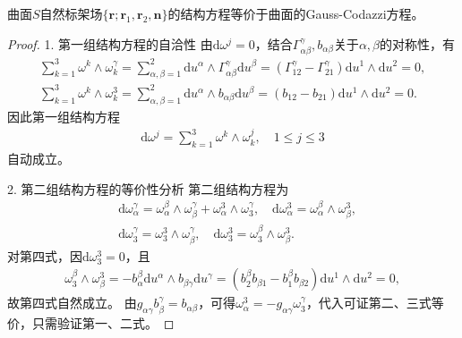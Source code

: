 \documentclass[../../main.tex]{subfiles}%
\begin{document}
\begin{proposition}
曲面$S$自然标架场$\{\boldsymbol{r};\boldsymbol{r}_1,\boldsymbol{r}_2,\boldsymbol{n}\}$的结构方程等价于曲面的Gauss-Codazzi方程。
\end{proposition}

\begin{proof}
1. 第一组结构方程的自洽性
由$\mathrm{d}\omega^j=0$，结合$\Gamma^\gamma_{\alpha\beta},b_{\alpha\beta}$关于$\alpha,\beta$的对称性，有
\begin{align*}
\sum_{k=1}^3\omega^k\wedge\omega^\gamma_k=\sum_{\alpha,\beta=1}^2\mathrm{d}u^\alpha\wedge\Gamma^\gamma_{\alpha\beta}\mathrm{d}u^\beta=(\Gamma^\gamma_{12}-\Gamma^\gamma_{21})\mathrm{d}u^1\wedge\mathrm{d}u^2=0,\\
\sum_{k=1}^3\omega^k\wedge\omega^3_k=\sum_{\alpha,\beta=1}^2\mathrm{d}u^\alpha\wedge b_{\alpha\beta}\mathrm{d}u^\beta=(b_{12}-b_{21})\mathrm{d}u^1\wedge\mathrm{d}u^2=0.
\end{align*}
因此第一组结构方程
\begin{align*}
\mathrm{d}\omega^j=\sum_{k=1}^3\omega^k\wedge\omega^j_k,\quad 1\leqslant j\leqslant3
\end{align*}
自动成立。

2. 第二组结构方程的等价性分析
第二组结构方程为
\begin{align*}
&\mathrm{d}\omega^\gamma_\alpha=\omega^\beta_\alpha\wedge\omega^\gamma_\beta+\omega^3_\alpha\wedge\omega^\gamma_3,\quad \mathrm{d}\omega^3_\alpha=\omega^\beta_\alpha\wedge\omega^3_\beta,\\
&\mathrm{d}\omega^\gamma_3=\omega^3_3\wedge\omega^\gamma_\beta,\quad \mathrm{d}\omega^3_3=\omega^\beta_3\wedge\omega^3_\beta.
\end{align*}
对第四式，因$\mathrm{d}\omega^3_3=0$，且
\begin{align*}
\omega^\beta_3\wedge\omega^3_\beta=-b^\beta_\alpha\mathrm{d}u^\alpha\wedge b_{\beta\gamma}\mathrm{d}u^\gamma=(b_2^\beta b_{\beta1}-b_1^\beta b_{\beta2})\mathrm{d}u^1\wedge\mathrm{d}u^2=0,
\end{align*}
故第四式自然成立。
由$g_{\alpha\gamma}b^\gamma_\beta=b_{\alpha\beta}$，可得$\omega^3_\alpha=-g_{\alpha\gamma}\omega^\gamma_3$，代入可证第二、三式等价，只需验证第一、二式。


\end{proof}
\end{document}
